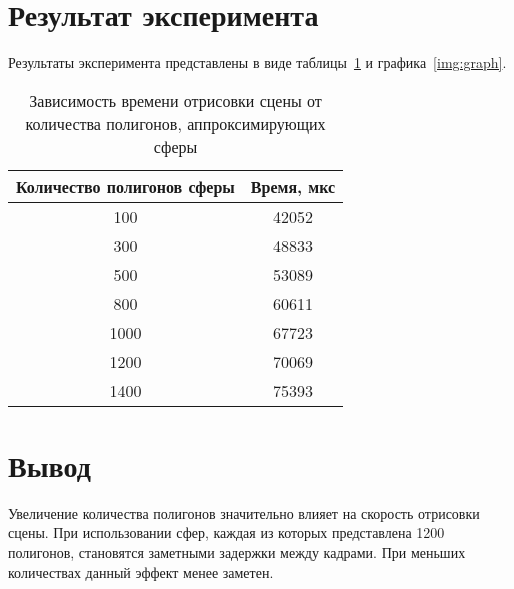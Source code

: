\section{Результат эксперимента}

Результаты эксперимента представлены в виде таблицы~\ref{tab:time} и графика~\ref{img:graph}.

\begin{table}[h]
	\begin{center}
		\caption{\label{tab:time} Зависимость времени отрисовки сцены от количества полигонов, аппроксимирующих сферы}
		\begin{tabular}{|c|c|}
			\hline
			Количество полигонов сферы & Время, мкс\\
			\hline
			100 & 42052\\
			\hline
			300 & 48833\\
			\hline
			500 & 53089\\
			\hline
			800 & 60611\\
			\hline
                1000 & 67723\\
			\hline
                1200 & 70069\\
			\hline
                1400 & 75393\\
			\hline
			
		\end{tabular}
	\end{center}
\end{table}



\section{Вывод}

Увеличение количества полигонов значительно влияет на скорость отрисовки сцены. При использовании сфер, каждая из которых представлена 1200 полигонов, становятся заметными задержки между кадрами. При меньших количествах данный эффект менее заметен.




